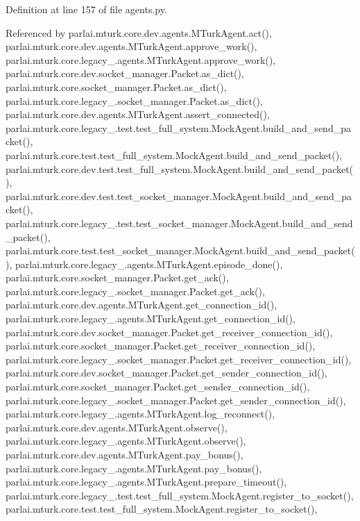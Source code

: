 Definition at line 157 of file agents.\+py.



Referenced by parlai.\+mturk.\+core.\+dev.\+agents.\+M\+Turk\+Agent.\+act(), parlai.\+mturk.\+core.\+dev.\+agents.\+M\+Turk\+Agent.\+approve\+\_\+work(), parlai.\+mturk.\+core.\+legacy\+\_.\+agents.\+M\+Turk\+Agent.\+approve\+\_\+work(), parlai.\+mturk.\+core.\+dev.\+socket\+\_\+manager.\+Packet.\+as\+\_\+dict(), parlai.\+mturk.\+core.\+socket\+\_\+manager.\+Packet.\+as\+\_\+dict(), parlai.\+mturk.\+core.\+legacy\+\_.\+socket\+\_\+manager.\+Packet.\+as\+\_\+dict(), parlai.\+mturk.\+core.\+dev.\+agents.\+M\+Turk\+Agent.\+assert\+\_\+connected(), parlai.\+mturk.\+core.\+legacy\+\_.\+test.\+test\+\_\+full\+\_\+system.\+Mock\+Agent.\+build\+\_\+and\+\_\+send\+\_\+packet(), parlai.\+mturk.\+core.\+test.\+test\+\_\+full\+\_\+system.\+Mock\+Agent.\+build\+\_\+and\+\_\+send\+\_\+packet(), parlai.\+mturk.\+core.\+dev.\+test.\+test\+\_\+full\+\_\+system.\+Mock\+Agent.\+build\+\_\+and\+\_\+send\+\_\+packet(), parlai.\+mturk.\+core.\+dev.\+test.\+test\+\_\+socket\+\_\+manager.\+Mock\+Agent.\+build\+\_\+and\+\_\+send\+\_\+packet(), parlai.\+mturk.\+core.\+legacy\+\_.\+test.\+test\+\_\+socket\+\_\+manager.\+Mock\+Agent.\+build\+\_\+and\+\_\+send\+\_\+packet(), parlai.\+mturk.\+core.\+test.\+test\+\_\+socket\+\_\+manager.\+Mock\+Agent.\+build\+\_\+and\+\_\+send\+\_\+packet(), parlai.\+mturk.\+core.\+legacy\+\_.\+agents.\+M\+Turk\+Agent.\+episode\+\_\+done(), parlai.\+mturk.\+core.\+socket\+\_\+manager.\+Packet.\+get\+\_\+ack(), parlai.\+mturk.\+core.\+legacy\+\_.\+socket\+\_\+manager.\+Packet.\+get\+\_\+ack(), parlai.\+mturk.\+core.\+dev.\+agents.\+M\+Turk\+Agent.\+get\+\_\+connection\+\_\+id(), parlai.\+mturk.\+core.\+legacy\+\_.\+agents.\+M\+Turk\+Agent.\+get\+\_\+connection\+\_\+id(), parlai.\+mturk.\+core.\+dev.\+socket\+\_\+manager.\+Packet.\+get\+\_\+receiver\+\_\+connection\+\_\+id(), parlai.\+mturk.\+core.\+socket\+\_\+manager.\+Packet.\+get\+\_\+receiver\+\_\+connection\+\_\+id(), parlai.\+mturk.\+core.\+legacy\+\_.\+socket\+\_\+manager.\+Packet.\+get\+\_\+receiver\+\_\+connection\+\_\+id(), parlai.\+mturk.\+core.\+dev.\+socket\+\_\+manager.\+Packet.\+get\+\_\+sender\+\_\+connection\+\_\+id(), parlai.\+mturk.\+core.\+socket\+\_\+manager.\+Packet.\+get\+\_\+sender\+\_\+connection\+\_\+id(), parlai.\+mturk.\+core.\+legacy\+\_.\+socket\+\_\+manager.\+Packet.\+get\+\_\+sender\+\_\+connection\+\_\+id(), parlai.\+mturk.\+core.\+legacy\+\_.\+agents.\+M\+Turk\+Agent.\+log\+\_\+reconnect(), parlai.\+mturk.\+core.\+dev.\+agents.\+M\+Turk\+Agent.\+observe(), parlai.\+mturk.\+core.\+legacy\+\_.\+agents.\+M\+Turk\+Agent.\+observe(), parlai.\+mturk.\+core.\+dev.\+agents.\+M\+Turk\+Agent.\+pay\+\_\+bonus(), parlai.\+mturk.\+core.\+legacy\+\_.\+agents.\+M\+Turk\+Agent.\+pay\+\_\+bonus(), parlai.\+mturk.\+core.\+legacy\+\_.\+agents.\+M\+Turk\+Agent.\+prepare\+\_\+timeout(), parlai.\+mturk.\+core.\+legacy\+\_.\+test.\+test\+\_\+full\+\_\+system.\+Mock\+Agent.\+register\+\_\+to\+\_\+socket(), parlai.\+mturk.\+core.\+test.\+test\+\_\+full\+\_\+system.\+Mock\+Agent.\+register\+\_\+to\+\_\+socket(), 